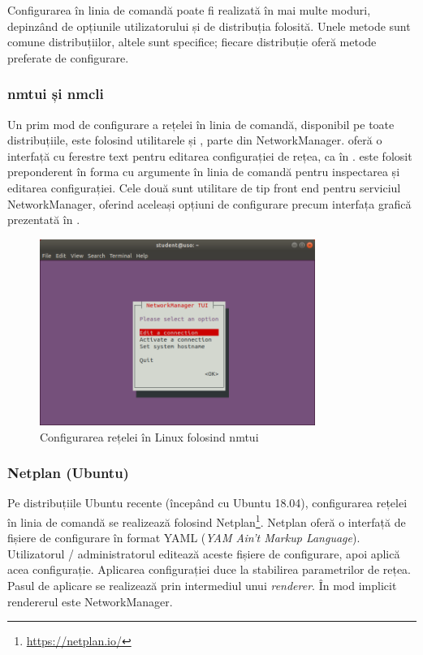 Configurarea în linia de comandă poate fi realizată în mai multe moduri, depinzând de opțiunile utilizatorului și de distribuția folosită.
Unele metode sunt comune distribuțiilor, altele sunt specifice; fiecare distribuție oferă metode preferate de configurare.

\subsubsection{nmtui și nmcli}
\label{sec:net:linux-config:cli:nm}

Un prim mod de configurare a rețelei în linia de comandă, disponibil pe toate distribuțiile, este folosind utilitarele  și , parte din NetworkManager.
 oferă o interfață cu ferestre text pentru editarea configurației de rețea, ca în .
 este folosit preponderent în forma cu argumente în linia de comandă pentru inspectarea și editarea configurației.
Cele două sunt utilitare de tip front end pentru serviciul NetworkManager, oferind aceleași opțiuni de configurare precum interfața grafică prezentată în .

\begin{figure}[!htbp]
  \centering
  \includegraphics[width=0.8\textwidth]{chapters/11-net/img/nmtui.png}
  \caption{Configurarea rețelei în Linux folosind nmtui}
  \label{fig:net:nmtui}
\end{figure}

\subsubsection{Netplan (Ubuntu)}
\label{sec:net:linux-config:cli:netplan}

Pe distribuțiile Ubuntu recente (începând cu Ubuntu 18.04), configurarea rețelei în linia de comandă se realizează folosind Netplan\footnote{\url{https://netplan.io/}}.
Netplan oferă o interfață de fișiere de configurare în format YAML  (\textit{YAM Ain't Markup Language}).
Utilizatorul / administratorul editează aceste fișiere de configurare, apoi aplică acea configurație.
Aplicarea configurației duce la stabilirea parametrilor de rețea.
Pasul de aplicare se realizează prin intermediul unui \textit{renderer}.
În mod implicit rendererul este NetworkManager.

